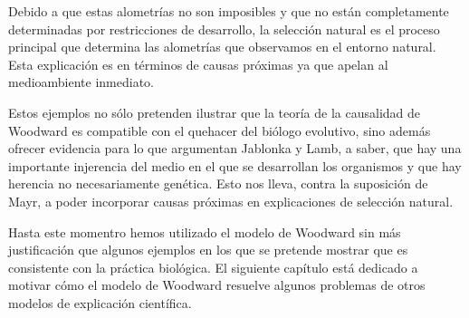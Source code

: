 Debido a que estas alometrías no son imposibles y que no están completamente determinadas por restricciones de desarrollo, la selección natural es el proceso principal que determina las alometrías que observamos en el entorno natural. Esta explicación es en términos de causas próximas ya que apelan al medioambiente inmediato.

Estos ejemplos no sólo pretenden ilustrar que la teoría de la causalidad de Woodward es compatible con el quehacer del biólogo evolutivo, sino además ofrecer evidencia para lo que argumentan Jablonka y Lamb, a saber, que hay una importante injerencia del medio en el que se desarrollan los organismos y que hay herencia no necesariamente genética.  Esto nos lleva, contra la suposición de Mayr, a poder incorporar causas próximas en explicaciones de selección natural.

Hasta este momentro hemos utilizado el modelo de Woodward sin más justificación que algunos ejemplos en los que se pretende mostrar que es consistente con la práctica biológica. El siguiente capítulo está dedicado a motivar cómo el modelo de Woodward resuelve algunos problemas de otros modelos de explicación científica. 
